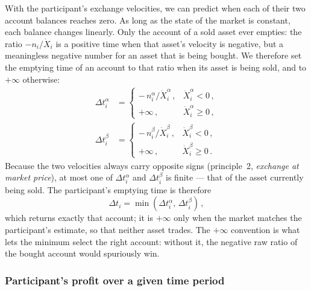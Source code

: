 \documentclass[letterpaper]{article}
\begin{document}
With the participant's exchange velocities, we can predict when each of their two account balances reaches zero. As long as the state of the market is constant, each balance changes linearly. Only the account of a sold asset ever empties: the ratio $-n_i/\dot{X}_i$ is a positive time when that asset's velocity is negative, but a meaningless negative number for an asset that is being bought.
We therefore set the emptying time of an account to that ratio when its asset is being sold, and to $+\infty$ otherwise:
\begin{align}
    \Delta t_i^\alpha &= \begin{cases} -\, n_i^\alpha / \dot{X}_i^\alpha \,, & \dot{X}_i^\alpha < 0 \,,\\ +\infty \,, & \dot{X}_i^\alpha \geq 0 \,, \end{cases} \nonumber\\
    \Delta t_i^\beta &= \begin{cases} -\, n_i^\beta / \dot{X}_i^\beta \,, & \dot{X}_i^\beta < 0 \,,\\ +\infty \,, & \dot{X}_i^\beta \geq 0 \,. \end{cases} \label{eqDeltaT}
\end{align}
Because the two velocities always carry opposite signs (principle~2, \emph{exchange at market price}), at most one of $\Delta t_i^\alpha$ and $\Delta t_i^\beta$ is finite --- that of the asset currently being sold. The participant's emptying time is therefore
\begin{equation}
    \Delta t_i = \min\!\left(\Delta t_i^\alpha,\, \Delta t_i^\beta\right) \,,
\end{equation}
which returns exactly that account; it is $+\infty$ only when the market matches the participant's estimate, so that neither asset trades. The $+\infty$ convention is what lets the minimum select the right account: without it, the negative raw ratio of the bought account would spuriously win.

\subsubsection{Participant's profit over a given time period}\label{secParticipantProfit}
\end{document}

